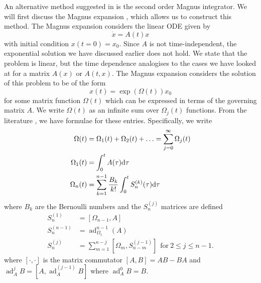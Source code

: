 An alternative method suggested in \cite{blanes_pos_2022} is the second order Magnus integrator.
We will first discuss the Magnus expansion \cite{Magnus_1954, blanesmagnus2009}, which allows us to construct this method.
The Magnus expansion considers the linear ODE given by
\begin{equation*}
    \dot{x} = A(t)x
\end{equation*}
with initial condition $x(t=0) = x_0$.
Since $A$ is not time-independent, the exponential solution we have discussed earlier does not hold.
We state that the problem is linear, but the time dependence analogises to the cases we have looked at for a matrix $A(x)$ or $A(t,x)$.
The Magnus expansion considers the solution of this problem to be of the form
\begin{equation*}
    x(t) = \exp(\Omega(t))x_0
\end{equation*}
for some matrix function $\Omega(t)$ which can be expressed in terms of the governing matrix $A$.
We write $\Omega(t)$ as an infinite sum over $\Omega_j(t)$ functions.
From the literature \cite{blanesmagnus2009}, we have formulae for these entries.
Specifically, we write
\begin{equation*}
    \begin{aligned}
        \Omega(t) &= \Omega_1(t) + \Omega_2(t) + \mathellipsis = \sum_{j = 0}^{\infty} \Omega_j (t) \\
        \Omega_1(t) &= \int_{0}^{t} A(\tau) \mathrm{d}\tau \\
        \Omega_n(t) &= \sum_{k=1}^{n-1} \frac{B_k}{k!} \int_{0}^{t} S_n^{(k)}(\tau) \mathrm{d}\tau \\
    \end{aligned}
\end{equation*}
where $B_k$ are the Bernoulli numbers \cite{bernoulli} and the $S_n^{(j)}$ matrices are defined
\begin{equation*}
    \begin{aligned}
        S_n^{(1)} &= [\Omega_{n-1}, A] \\
        S_n^{(n-1)} &= \operatorname{ad}_{\Omega_1}^{n-1}(A) \\
        S_n^{(j)} &= \sum_{m=1}^{n-j} \left[ \Omega_m, S_{n-m}^{(j-1)} \right] ~~ \text{for}~ 2 \le j \le n-1.
    \end{aligned} 
\end{equation*}
where $\left[\cdot, \cdot\right]$ is the matrix commutator $[A,B] = AB-BA$ and $\operatorname{ad}_A^{j} B = [ A, \operatorname{ad}_A^{(j-1)}B ]$ where $\operatorname{ad}_A^0 B = B$.

